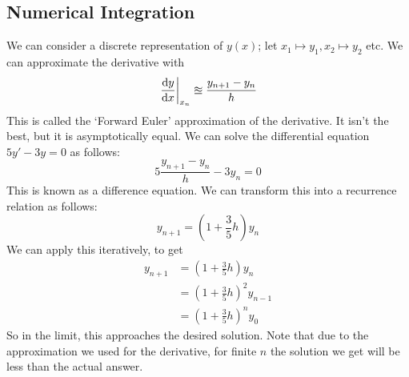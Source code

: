 \documentclass{article}
\begin{document}
\subsection{Numerical Integration}
We can consider a discrete representation of $y(x)$; let $x_1 \mapsto y_1, x_2 \mapsto y_2$ etc. We can approximate the derivative with
\[ \eval{\frac{\dd{y}}{\dd{x}}}_{x_n} \approxeq \frac{y_{n+1} - y_n}{h} \]
This is called the `Forward Euler' approximation of the derivative. It isn't the best, but it is asymptotically equal. We can solve the differential equation $5y' - 3y = 0$ as follows:
\[ 5 \frac{y_{n+1} - y_n}{h} - 3y_n = 0 \]
This is known as a difference equation. We can transform this into a recurrence relation as follows:
\[ y_{n+1} = \left( 1 + \frac{3}{5}h \right) y_n \]
We can apply this iteratively, to get
\begin{align*}
	y_{n+1} & = \left( 1 + \frac{3}{5}h \right) y_n       \\
	        & = \left( 1 + \frac{3}{5}h \right)^2 y_{n-1} \\
	        & = \left( 1 + \frac{3}{5}h \right)^n y_{0}
\end{align*}
So in the limit, this approaches the desired solution. Note that due to the approximation we used for the derivative, for finite $n$ the solution we get will be less than the actual answer.
\end{document}
